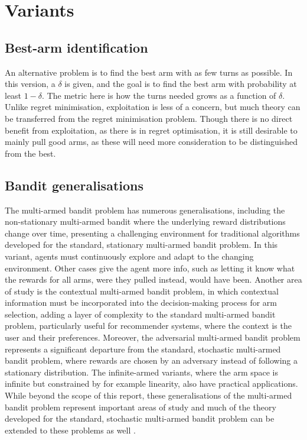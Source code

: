\section{Variants}
\subsection{Best-arm identification}
An alternative problem is to find the best arm with as few turns as possible.
In this version, a $\delta$ is given, and the goal is to find the best arm with probability at least $1-\delta$.
The metric here is how the turns needed grows as a function of $\delta$.
Unlike regret minimisation, exploitation is less of a concern, but much theory can be transferred from the regret minimisation problem.
Though there is no direct benefit from exploitation, as there is in regret optimisation, it is still desirable to mainly pull good arms, as these will need more consideration to be distinguished from the best.

\subsection{Bandit generalisations}
The multi-armed bandit problem has numerous generalisations, including the non-stationary multi-armed bandit where the underlying reward distributions change over time, presenting a challenging environment for traditional algorithms developed for the standard, stationary multi-armed bandit problem.
In this variant, agents must continuously explore and adapt to the changing environment.
Other cases give the agent more info, such as letting it know what the rewards for all arms, were they pulled instead, would have been.
Another area of study is the contextual multi-armed bandit problem, in which contextual information must be incorporated into the decision-making process for arm selection, adding a layer of complexity to the standard multi-armed bandit problem, particularly useful for recommender systems, where the context is the user and their preferences.
Moreover, the adversarial multi-armed bandit problem represents a significant departure from the standard, stochastic multi-armed bandit problem, where rewards are chosen by an adversary instead of following a stationary distribution.
The infinite-armed variants, where the arm space is infinite but constrained by for example linearity, also have practical applications.
While beyond the scope of this report, these generalisations of the multi-armed bandit problem represent important areas of study and much of the theory developed for the standard, stochastic multi-armed bandit problem can be extended to these problems as well \autocite{slivkins2019,lattimore2020}.


